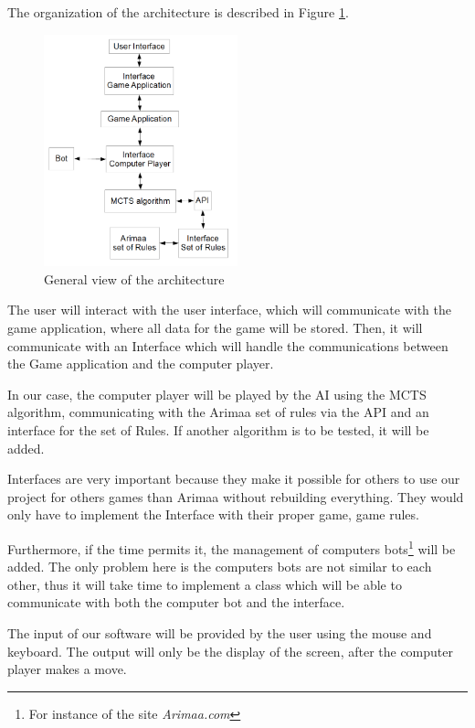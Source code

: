 The organization of the architecture is described in Figure \ref{fig:gen}.

\begin{figure}[!h]
\centering
\includegraphics[width=0.5\textwidth]{2General_Architecture/2.1.2GeneralView/gen.png}
\caption{General view of the architecture}
\label{fig:gen}
\end{figure}

The user will interact with the user interface, which will communicate with the game application, where all data for the game will be stored. Then, it will communicate with an Interface which will handle the communications between the Game application and the computer player. 

In our case, the computer player will be played by the AI using the MCTS algorithm, communicating with the Arimaa set of rules via the API and an interface for the set of Rules.  If another algorithm is to be tested, it will be added.

Interfaces are very important because they make it possible for others to use our project for others games than Arimaa without rebuilding everything. They would only have to implement the Interface with their proper game, game rules.

Furthermore, if the time permits it, the management of computers bots\footnote{For instance of the site \textit{Arimaa.com}} will be added. The only problem here is the computers bots are not similar to each other, thus it will take time to implement a class which will be able to communicate with both the computer bot and the interface.

The input of our software will be provided by the user using the mouse and keyboard. The output will only be the display of the screen, after the computer player makes a move.